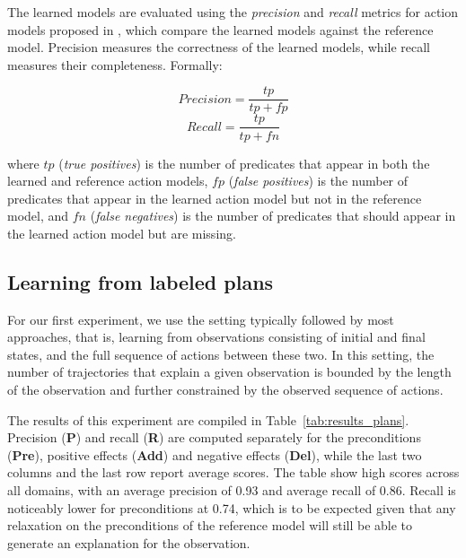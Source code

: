 \documentclass[runningheads]{llncs}
\begin{document}
The learned models are evaluated using the {\em precision} and {\em recall} metrics for action models proposed in \cite{aineto2018learning}, which compare the learned models against the reference model. Precision measures the correctness of the learned models, while recall measures their completeness. Formally:

\[
Precision=\frac{tp}{tp+fp}
\]
\[
Recall=\frac{tp}{tp+fn}
\]

where $tp$ ({\em true positives}) is the number of predicates that appear in both the learned and reference action models, $fp$ ({\em false positives}) is the number of predicates that appear in the learned action model but not in the reference model, and $fn$ ({\em false negatives}) is the number of predicates that should appear in the learned action model but are missing.

\subsection{Learning from labeled plans}
For our first experiment, we use the setting typically followed by most approaches, that is, learning from observations consisting of initial and final states, and the full sequence of actions between these two. In this setting, the number of trajectories that explain a given observation is bounded by the length of the observation and further constrained by the observed sequence of actions.

The results of this experiment are compiled in Table~\ref{tab:results_plans}. Precision ({\bf P}) and recall ({\bf R}) are computed separately for the preconditions ({\bf Pre}), positive effects ({\bf Add}) and negative effects ({\bf Del}), while the last two columns and the last row report average scores. The table show high scores across all domains, with an average precision of 0.93 and average recall of 0.86. Recall is noticeably lower for preconditions at 0.74, which is to be expected given that any relaxation on the preconditions of the reference model will still be able to generate an explanation for the observation.
\end{document}
